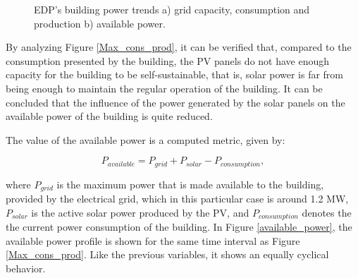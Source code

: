 \begin{figure}[h!]
    \captionsetup[subfigure]{position=b}
    \centering
    \label{fig:ap}
    \caption{EDP's building power trends a) grid capacity, consumption and production b) available power.}
\end{figure}


By analyzing Figure \ref{Max_cons_prod}, it can be verified that, compared to the consumption presented by the building, the \ac{PV} panels do not have enough capacity for the building to be self-sustainable, that is, solar power is far from being enough to maintain the regular operation of the building. It can be concluded that the influence of the power generated by the solar panels on the available power of the building is quite reduced. 

The value of the available power is a computed metric, given by:

\begin{equation}
   P_{available} = P_{grid} + P_{solar} - P_{consumption},
   \label{available}
\end{equation}

where $P_{grid}$ is the maximum power that is made available to the building, provided by the electrical grid, which in this particular case is around 1.2 MW, $P_{solar}$ is the active solar power produced by the \ac{PV}, and $P_{consumption}$ denotes the the current power consumption of the building. In Figure \ref{available_power}, the available power profile is shown for the same time interval as Figure \ref{Max_cons_prod}. Like the previous variables, it shows an equally cyclical behavior.


